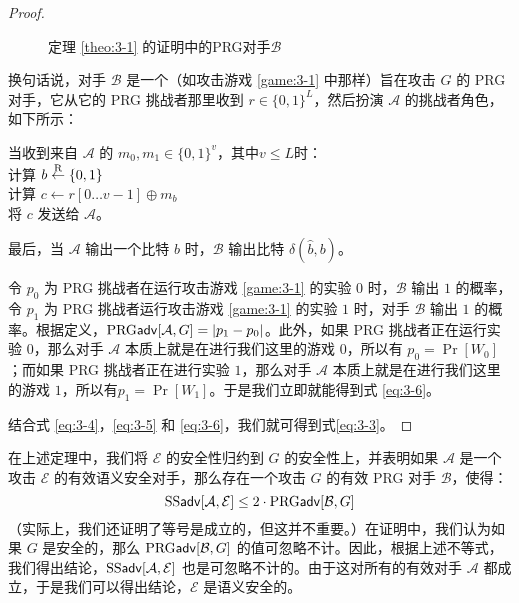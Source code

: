\begin{proof}
\begin{figure}
	\centering
	
	\caption{定理 \ref{theo:3-1} 的证明中的PRG对手$\mathcal{B}$}
	\label{fig:3-4}
\end{figure}

换句话说，对手 $\mathcal B$ 是一个（如攻击游戏 \ref{game:3-1} 中那样）旨在攻击 $G$ 的 PRG 对手，它从它的 PRG 挑战者那里收到 $r\in\{0,1\}^L$，然后扮演 $\mathcal A$ 的挑战者角色，如下所示：

\vspace*{5pt}

\hspace*{5pt} 当收到来自 $\mathcal A$ 的 $m_0,m_1\in\{0,1\}^v$，其中$v\leq L$时：\\
\hspace*{50pt} 计算 $b\overset{\rm R}\leftarrow\{0,1\}$\\
\hspace*{50pt} 计算 $c\leftarrow r[0\dots v-1]\oplus m_b$\\
\hspace*{50pt} 将 $c$ 发送给 $\mathcal A$。

\vspace*{5pt}

\noindent
最后，当 $\mathcal A$ 输出一个比特 $\hat b$ 时，$\mathcal B$ 输出比特 $\delta(\hat b,b)$。

令 $p_0$ 为 PRG 挑战者在运行攻击游戏 \ref{game:3-1} 的实验 $0$ 时，$\mathcal B$ 输出 $1$ 的概率，令 $p_1$ 为 PRG 挑战者运行攻击游戏 \ref{game:3-1} 的实验 $1$ 时，对手 $\mathcal B$ 输出 $1$ 的概率。根据定义，${\rm PRG\mathsf{adv}}[\mathcal{A},G]=|p_1-p_0|$。此外，如果 PRG 挑战者正在运行实验 $0$，那么对手 $\mathcal A$ 本质上就是在进行我们这里的游戏 $0$，所以有 $p_0=\Pr[W_0]$；而如果 PRG 挑战者正在进行实验  $1$，那么对手 $\mathcal A$ 本质上就是在进行我们这里的游戏 $1$，所以有$p_1=\Pr[W_1]$。于是我们立即就能得到式 \ref{eq:3-6}。

结合式 \ref{eq:3-4}，\ref{eq:3-5} 和 \ref{eq:3-6}，我们就可得到式\ref{eq:3-3}。
\end{proof}

在上述定理中，我们将 $\mathcal E$ 的安全性归约到 $G$ 的安全性上，并表明如果 $\mathcal A$ 是一个攻击 $\mathcal E$ 的有效语义安全对手，那么存在一个攻击 $G$ 的有效 PRG 对手 $\mathcal B$，使得：
\[
{\rm SS\mathsf{adv}}[\mathcal{A},\mathcal{E}]\leq 2\cdot{\rm PRG\mathsf{adv}}[\mathcal{B},G]
\]
（实际上，我们还证明了等号是成立的，但这并不重要。）在证明中，我们认为如果 $G$ 是安全的，那么 ${\rm PRG\mathsf{adv}}[\mathcal{B},G]$ 的值可忽略不计。因此，根据上述不等式，我们得出结论，${\rm SS\mathsf{adv}}[\mathcal{A},\mathcal{E}]$ 也是可忽略不计的。由于这对所有的有效对手 $\mathcal A$ 都成立，于是我们可以得出结论，$\mathcal E$ 是语义安全的。

